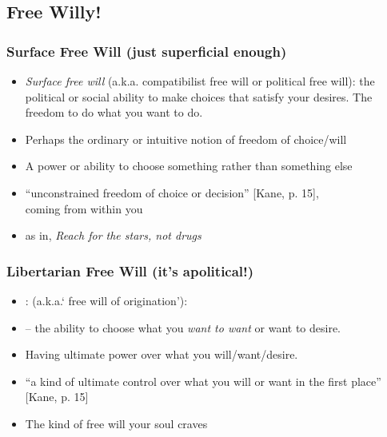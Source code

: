 \subsection{Free Willy!}

\begin{frame}
\frametitle{Surface Free Will (just superficial enough)}

\begin{itemize}[<+->]

\item \emph{Surface free will} (a.k.a. compatibilist free will or political free will): the political or social ability to make choices that satisfy your desires. The freedom to do what you want to do.
\item Perhaps the ordinary or intuitive notion of freedom of choice/will
\item A power or ability to choose something rather than something else
\item ``unconstrained freedom of choice or decision'' [Kane, p. 15], \\ coming from within you

\item as in, \textit{Reach for the stars, not drugs} 

\end{itemize}
\end{frame}

\begin{frame}
\frametitle{Libertarian Free Will (it's apolitical!)}

\begin{itemize}[<+->]

\item {}: (a.k.a.` free will of origination'): 
\item[] -- the ability to choose what you \textit{want to want} or want to desire. 
\item Having ultimate power over what you will/want/desire. %
\item ``a kind of ultimate control over what you will or want in the first place'' [Kane, p. 15]

\item The kind of free will your soul craves 


\end{itemize}
\end{frame}

